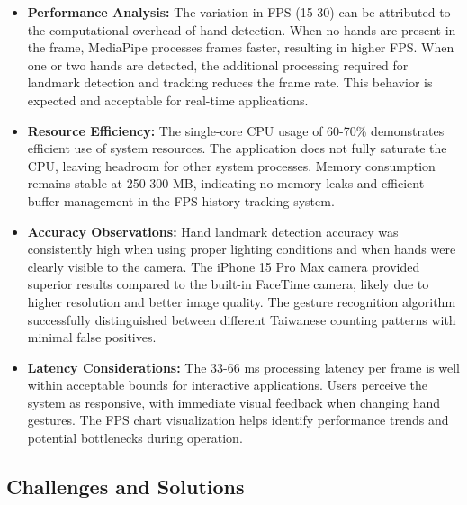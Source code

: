 \documentclass{article}
\begin{document}
\begin{itemize}

\item \textbf{Performance Analysis:} The variation in FPS (15-30) can be attributed to the computational overhead of hand detection. When no hands are present in the frame, MediaPipe processes frames faster, resulting in higher FPS. When one or two hands are detected, the additional processing required for landmark detection and tracking reduces the frame rate. This behavior is expected and acceptable for real-time applications.

\item \textbf{Resource Efficiency:} The single-core CPU usage of 60-70\% demonstrates efficient use of system resources. The application does not fully saturate the CPU, leaving headroom for other system processes. Memory consumption remains stable at 250-300 MB, indicating no memory leaks and efficient buffer management in the FPS history tracking system.

\item \textbf{Accuracy Observations:} Hand landmark detection accuracy was consistently high when using proper lighting conditions and when hands were clearly visible to the camera. The iPhone 15 Pro Max camera provided superior results compared to the built-in FaceTime camera, likely due to higher resolution and better image quality. The gesture recognition algorithm successfully distinguished between different Taiwanese counting patterns with minimal false positives.

\item \textbf{Latency Considerations:} The 33-66 ms processing latency per frame is well within acceptable bounds for interactive applications. Users perceive the system as responsive, with immediate visual feedback when changing hand gestures. The FPS chart visualization helps identify performance trends and potential bottlenecks during operation.

\end{itemize}

\subsection{Challenges and Solutions}
\end{document}
